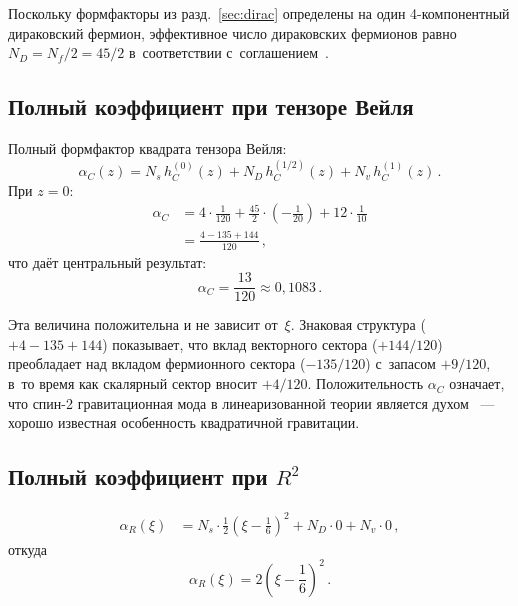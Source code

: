 \documentclass[aps,prd,twocolumn,superscriptaddress,nofootinbib,floatfix]{revtex4-2}
\theoremstyle{definition}
\theoremstyle{remark}
\begin{document}
Поскольку формфакторы из разд.~\ref{sec:dirac} определены на один
4-компонентный дираковский фермион, эффективное число дираковских фермионов
равно $N_D = N_f/2 = 45/2$ в~соответствии с~соглашением~\cite{Codello:2008vh}.

\subsection{Полный коэффициент при тензоре Вейля}

Полный формфактор квадрата тензора Вейля:
\begin{equation}
  \alpha_C(z) = N_s\,h_C^{(0)}(z) + N_D\,h_C^{(1/2)}(z)
    + N_v\,h_C^{(1)}(z)\,.
  \label{eq:alphaC-z}
\end{equation}
При $z = 0$:
\begin{align}
  \alpha_C &= 4 \cdot \frac{1}{120}
    + \frac{45}{2}\cdot\!\left(-\frac{1}{20}\right)
    + 12 \cdot \frac{1}{10} \nonumber\\
  &= \frac{4 - 135 + 144}{120}\,,
  \label{eq:alphaC-sum}
\end{align}
что даёт центральный результат:
\begin{equation}
  \boxed{\alpha_C = \frac{13}{120} \approx 0{,}1083\,.}
  \label{eq:alphaC}
\end{equation}

Эта величина положительна и не зависит от~$\xi$. Знаковая структура
($+4 - 135 + 144$) показывает, что вклад векторного сектора ($+144/120$)
преобладает над вкладом фермионного сектора ($-135/120$) с~запасом $+9/120$,
в~то время как скалярный сектор вносит $+4/120$. Положительность $\alpha_C$
означает, что спин-2 гравитационная мода в линеаризованной теории является
духом~\cite{Stelle:1976gc} --- хорошо известная особенность квадратичной
гравитации.

\subsection{Полный коэффициент при \texorpdfstring{$R^2$}{R2}}

\begin{align}
  \alpha_R(\xi) &= N_s \cdot \frac{1}{2}\!\left(\xi - \frac{1}{6}\right)^{\!2}
    + N_D \cdot 0 + N_v \cdot 0\,,
\end{align}
откуда
\begin{equation}
  \boxed{\alpha_R(\xi) = 2\!\left(\xi - \frac{1}{6}\right)^{\!2}\,.}
  \label{eq:alphaR}
\end{equation}
\end{document}

